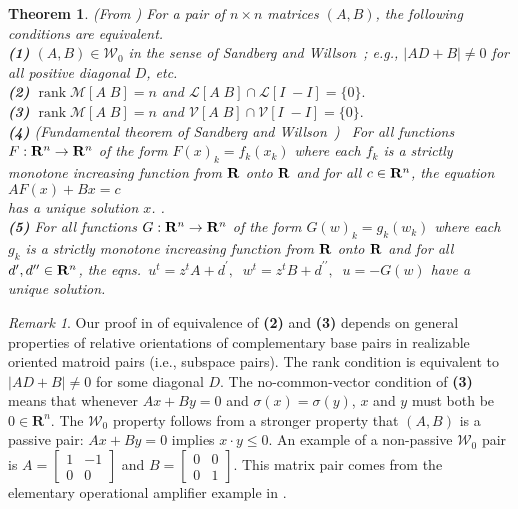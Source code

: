 \documentclass{amsproc-sunycstr}
\def\Reals{\ensuremath{\mathbf R}}
\theoremstyle{plain}
\newtheorem{theorem}{Theorem}
\theoremstyle{definition}
\theoremstyle{remark}
\newtheorem{remark}{Remark}
\DeclareMathOperator{\rank}{rank}
\newcommand{\hmat}[2]{[#1\;#2]}
\begin{document}
\begin{theorem}
\label{sandwillompairtheorem}
(From \cite{sdcOMP}) For a pair 
%
%
of $n\times n$ 
matrices $(A,B)$, the following conditions are 
equivalent.\\
%
%
\textbf{(1)}
$(A,B)\in {\mathcal W}_0$ in the sense of 
Sandberg and 
Willson~\cite{SWExistancePf};
e.g., $|AD+B|\neq 0$ for all positive diagonal $D$, etc.\\
\textbf{(2)}
$\rank{\mathcal M}\hmat{A}{B}=n$ and 
${\mathcal L}\hmat{A}{B} \cap {\mathcal L}\hmat{I}{-I}=\{0\}.$\\
\textbf{(3)}
$\rank{\mathcal M}\hmat{A}{B}=n$ and 
${\mathcal V}\hmat{A}{B} \cap {\mathcal V}\hmat{I}{-I}=\{0\}.$\\
\textbf{(4)}
\textrm{(}Fundamental theorem of Sandberg and 
Willson~\cite{SWExistancePf,W0APPLpaper}\textrm{)}\ 
%
%
For all functions $F:{\bf R}^n\rightarrow {\bf R}^n$ of the form
$F(x)_k=f_k(x_k)$ where each $f_k$ is a strictly 
monotone increasing 
function from 
${\bf R}$ {\em onto} $\bf R$ and for all $c\in {\bf R}^n$, the 
equation $AF(x) + Bx = c$\\
has a unique solution $x$. \cite{W0APPLpaper}.\\
\textbf{(5)}
For all functions $G:{\bf R}^n\rightarrow {\bf R}^n$ of the form
$G(w)_k=g_k(w_k)$ where each $g_k$ is a strictly monotone increasing 
function from ${\bf R}$ {\em onto} $\bf R$ and for all 
$d^{\prime}, d^{\prime\prime}\in {\bf R}^n$, the 
eqns.\ $u^t=z^tA+d^{\prime},\;\; w^t=z^tB+d^{\prime\prime},\;\; u=-G(w)$
have a unique solution.%
\end{theorem}

\begin{remark}
Our proof in \cite{sdcOMP} 
of equivalence of \textbf{(2)} and \textbf{(3)} depends on
general properties of relative orientations of complementary 
base pairs in
realizable oriented matroid pairs (i.e., subspace pairs).
The rank condition is equivalent to $|AD+B|\neq 0$ for some
diagonal $D$.  The no-common-vector condition of \textbf{(3)} means
that whenever $Ax+By=0$ and $\sigma(x)=\sigma(y)$, $x$ and $y$
must both be $0\in\Reals^n$.  The $\mathcal{W}_0$ property follows
from\cite{SWExistanceSIAM} a  stronger property that 
$(A,B)$ is a passive pair: $Ax+By=0$ implies $x\cdot y \leq 0$.
An example of a non-passive $\mathcal{W}_0$ pair is
$A=\left[\begin{array}{cc}1 & -1 \\ 0 & 0\end{array}\right]$ and 
$B=\left[\begin{array}{cc}0 & 0 \\ 0 & 1\end{array}\right]$.
This matrix pair comes from the elementary operational amplifier
example in \cite{sdcOMP}.
\end{remark}
\end{document}
